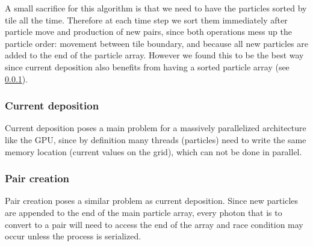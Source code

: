 
A small sacrifice for this algorithm is that we need to have the particles
sorted by tile all the time. Therefore at each time step we sort them
immediately after particle move and production of new pairs, since both
operations mess up the particle order: movement between tile boundary, and
because all new particles are added to the end of the particle array. However we
found this to be the best way since current deposition also benefits from having
a sorted particle array (see \ref{sec:gpu-deposit}).

\subsubsection{Current deposition}
\label{sec:gpu-deposit}

Current deposition poses a main problem for a massively parallelized
architecture like the GPU, since by definition many threads (particles) need to
write the same memory location (current values on the grid), which can not be
done in parallel.

\subsubsection{Pair creation}
\label{sec:gpu-pair}

Pair creation poses a similar problem as current deposition. Since new particles
are appended to the end of the main particle array, every photon that is to
convert to a pair will need to access the end of the array and race condition
may occur unless the process is serialized.



